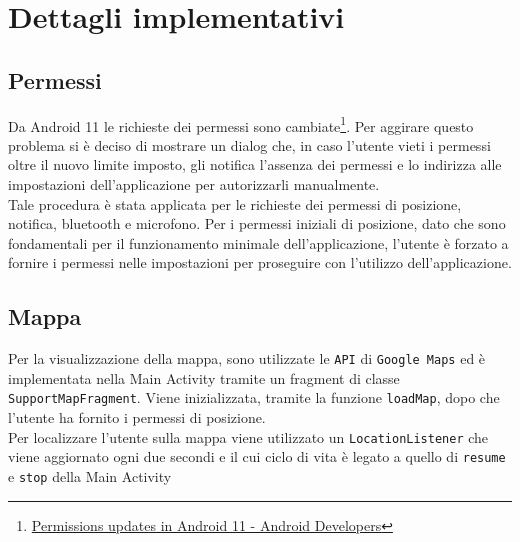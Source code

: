 \documentclass[11pt]{article}
\begin{document}
\section{Dettagli implementativi}
\subsection{Permessi}
\label{sec:permessi}
Da Android 11 le richieste dei permessi sono cambiate\footnote{\href{https://developer.android.com/about/versions/11/privacy/permissions?hl=en\#dialog-visibility}{Permissions updates in Android 11 - Android Developers}}. Per aggirare questo problema si è deciso di mostrare un dialog che, in caso l'utente vieti i permessi oltre il nuovo limite imposto, gli notifica l'assenza dei permessi e lo indirizza alle impostazioni dell'applicazione per autorizzarli manualmente. \\
Tale procedura è stata applicata per le richieste dei permessi di posizione, notifica, bluetooth e microfono. Per i permessi iniziali di posizione, dato che sono fondamentali per il funzionamento minimale dell'applicazione, l'utente è forzato a fornire i permessi nelle impostazioni per proseguire con l'utilizzo dell'applicazione.
\subsection{Mappa}
Per la visualizzazione della mappa, sono utilizzate le \texttt{API} di \texttt{Google Maps} ed è implementata nella Main Activity tramite un fragment di classe \texttt{SupportMapFragment}. Viene inizializzata, tramite la funzione \texttt{loadMap}, dopo che l'utente ha fornito i permessi di posizione. \\
Per localizzare l'utente sulla mappa viene utilizzato un \texttt{LocationListener} che viene aggiornato ogni due secondi e il cui ciclo di vita è legato a quello di \texttt{resume} e \texttt{stop} della Main Activity
\end{document}
